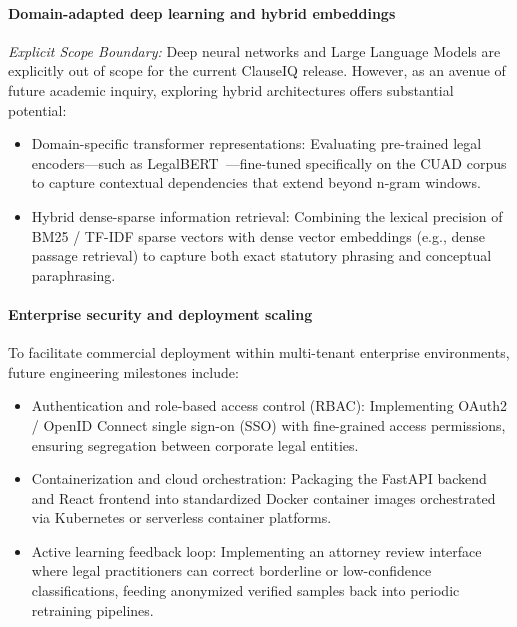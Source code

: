 \paragraph*{Domain-adapted deep learning and hybrid embeddings}
\textit{Explicit Scope Boundary:} Deep neural networks and Large Language Models are explicitly out of scope for the current ClauseIQ release. However, as an avenue of future academic inquiry, exploring hybrid architectures offers substantial potential:
\begin{itemize}
    \item Domain-specific transformer representations: Evaluating pre-trained legal encoders---such as LegalBERT~\cite{chalkidis2020legal}---fine-tuned specifically on the CUAD corpus to capture contextual dependencies that extend beyond n-gram windows.
    \item Hybrid dense-sparse information retrieval: Combining the lexical precision of BM25 / TF-IDF sparse vectors with dense vector embeddings (e.g., dense passage retrieval) to capture both exact statutory phrasing and conceptual paraphrasing.
\end{itemize}

\paragraph*{Enterprise security and deployment scaling}
To facilitate commercial deployment within multi-tenant enterprise environments, future engineering milestones include:
\begin{itemize}
    \item Authentication and role-based access control (RBAC): Implementing OAuth2 / OpenID Connect single sign-on (SSO) with fine-grained access permissions, ensuring segregation between corporate legal entities.
    \item Containerization and cloud orchestration: Packaging the FastAPI backend and React frontend into standardized Docker container images orchestrated via Kubernetes or serverless container platforms.
    \item Active learning feedback loop: Implementing an attorney review interface where legal practitioners can correct borderline or low-confidence classifications, feeding anonymized verified samples back into periodic retraining pipelines.
\end{itemize}
